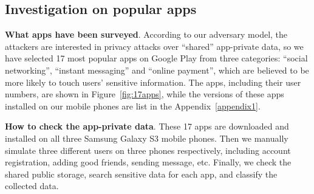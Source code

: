 \documentclass{sig-alternate}
\begin{document}
\subsection{Investigation on popular apps}
\label{findingpopular}


\noindent\textbf{What apps have been surveyed}. According to our adversary model, the attackers are interested in privacy attacks over ``shared'' app-private data, so we have selected 17 most popular apps on Google Play from three categories: ``social networking'', ``instant messaging'' and ``online payment'', which are believed to be more likely to touch users' sensitive information. The apps, including their user numbers, are shown in Figure~\ref{fig:17apps}, while the versions of these apps installed on our mobile phones are list in the Appendix~\ref{appendix1}.

\noindent\textbf{How to check the app-private data}. These 17 apps are downloaded and installed on all three Samsung Galaxy S3 mobile phones. Then we manually simulate three different users on three phones respectively, including account registration, adding good friends, sending message, etc. Finally, we check the shared public storage, search sensitive data for each app, and classify the collected data.




\begin{figure*}[ht]

\end{figure*}
\end{document}
